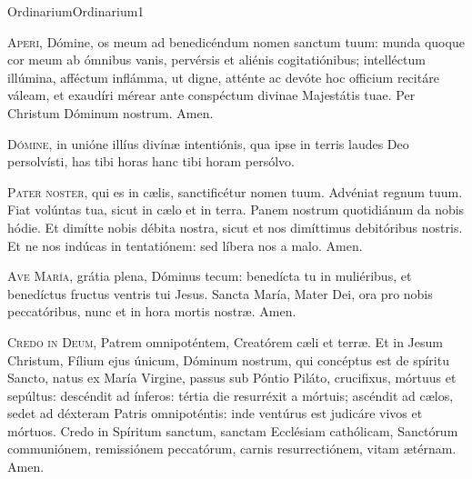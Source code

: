 \documentclass[liber-responsorialis-aestivus.tex]{subfiles}
\begin{document}
	{Ordinarium}{Ordinarium}{1}{}{}{}{}{}{}


\begin{multicols}{2}
\lettrine{A}{peri}, Dómine, os meum ad benedicéndum nomen sanctum tuum:
munda quoque cor meum ab ómnibus vanis, pervérsis et aliénis cogitatiónibus; 
intelléctum illúmina, afféctum inflámma, ut digne, atténte ac devóte
hoc officium recitáre váleam, et exaudíri mérear
ante conspéctum divinae Majestátis tuae. Per Christum Dóminum nostrum. Amen.

\lettrine{D}{ómine}, in unióne illíus divínæ intentiónis,
qua ipse in terris laudes Deo persolvísti,
has tibi horas  hanc tibi horam\rubric{)} persólvo.
\end{multicols}


\begin{multicols}{2}
\lettrine{P}{ater noster}, qui es in cælis, sanctificétur nomen tuum.
Advéniat regnum tuum. Fiat volúntas tua, sicut in cælo et in terra.
Panem nostrum quotidiánum da nobis hódie.
Et dimítte nobis débita nostra, sicut et nos dimíttimus debitóribus nostris.
Et ne nos indúcas in tentatiónem: sed líbera nos a malo. Amen.

\lettrine{A}{ve María}, grátia plena, Dóminus tecum:
benedícta tu in muliéribus, et benedíctus fructus ventris tui Jesus.
Sancta María, Mater Dei, ora pro nobis peccatóribus,
nunc et in hora mortis nostræ. Amen.

\lettrine{C}{redo in Deum}, Patrem omnipoténtem, Creatórem cæli et terræ.
Et in Jesum Christum, Fílium ejus únicum, Dóminum nostrum,
qui concéptus est de spíritu Sancto, natus ex María Virgine,
passus sub Póntio Piláto, crucifixus, mórtuus et sepúltus:
descéndit ad ínferos: tértia die resurréxit a mórtuis;
ascéndit ad cælos, sedet ad déxteram Patris omnipoténtis:
inde ventúrus est judicáre vivos et mórtuos.
Credo in Spíritum sanctum, sanctam Ecclésiam cathólicam,
Sanctórum communiónem, remissiónem peccatórum,
carnis resurrectiónem, vitam ætérnam. Amen.
\end{multicols}
\end{document}
